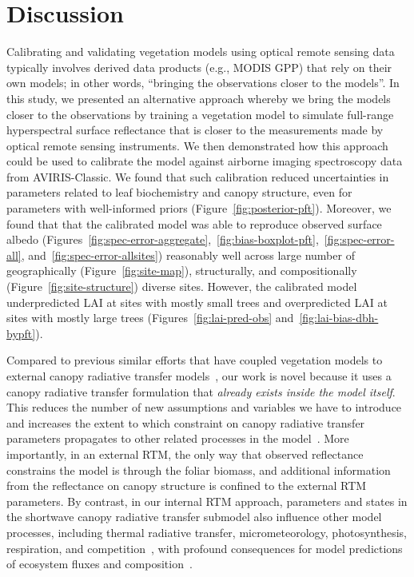 \section{Discussion}

Calibrating and validating vegetation models using optical remote sensing data typically involves derived data products (e.g., MODIS GPP) that rely on their own models;
in other words, ``bringing the observations closer to the models''.
In this study, we presented an alternative approach whereby we bring the models closer to the observations by training a vegetation model to simulate full-range hyperspectral surface reflectance that is closer to the measurements made by optical remote sensing instruments.
We then demonstrated how this approach could be used to calibrate the model against airborne imaging spectroscopy data from AVIRIS-Classic.
We found that such calibration reduced uncertainties in parameters related to leaf biochemistry and canopy structure, even for parameters with well-informed priors (Figure~\ref{fig:posterior-pft}).
Moreover, we found that that the calibrated model was able to reproduce observed surface albedo
(Figures~\ref{fig:spec-error-aggregate},~\ref{fig:bias-boxplot-pft},~\ref{fig:spec-error-all}, and~\ref{fig:spec-error-allsites})
reasonably well across large number of geographically (Figure~\ref{fig:site-map}), structurally, and compositionally (Figure~\ref{fig:site-structure}) diverse sites.
However, the calibrated model underpredicted LAI at sites with mostly small trees and overpredicted LAI at sites with mostly large trees (Figures~\ref{fig:lai-pred-obs} and~\ref{fig:lai-bias-dbh-bypft}).

Compared to previous similar efforts that have coupled vegetation models to external canopy radiative transfer models~\citep{knorr2001assimilation, nouvellon2001coupling, quaife2008assimilating},
our work is novel because it uses a canopy radiative transfer formulation that \emph{already exists inside the model itself}.
This reduces the number of new assumptions and variables we have to introduce and increases the extent to which constraint on canopy radiative transfer parameters propagates to other related processes in the model~\citep{viskari_2019_influence}.
More importantly, in an external RTM, the only way that observed reflectance constrains the model is through the foliar biomass, and additional information from the reflectance on canopy structure is confined to the external RTM parameters.
By contrast, in our internal RTM approach, parameters and states in the shortwave canopy radiative transfer submodel also influence other model processes, including thermal radiative transfer, micrometeorology, photosynthesis, respiration, and competition~\citep{longo2019ed2description}, with profound consequences for model predictions of ecosystem fluxes and composition~\citep{viskari_2019_influence}.

